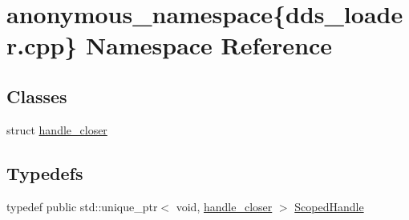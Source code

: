 \hypertarget{namespaceanonymous__namespace_02dds__loader_8cpp_03}{}\section{anonymous\+\_\+namespace\{dds\+\_\+loader.\+cpp\} Namespace Reference}
\label{namespaceanonymous__namespace_02dds__loader_8cpp_03}
\subsection*{Classes}
\begin{DoxyCompactItemize}
\item 
struct \mbox{\hyperlink{structanonymous__namespace_02dds__loader_8cpp_03_1_1handle__closer}{handle\+\_\+closer}}
\end{DoxyCompactItemize}
\subsection*{Typedefs}
\begin{DoxyCompactItemize}
\item 
typedef public std\+::unique\+\_\+ptr$<$ void, \mbox{\hyperlink{structanonymous__namespace_02dds__loader_8cpp_03_1_1handle__closer}{handle\+\_\+closer}} $>$ \mbox{\hyperlink{namespaceanonymous__namespace_02dds__loader_8cpp_03_a9d9d95d4fe1f262059ad87b68d4eef46}{Scoped\+Handle}}
\end{DoxyCompactItemize}
